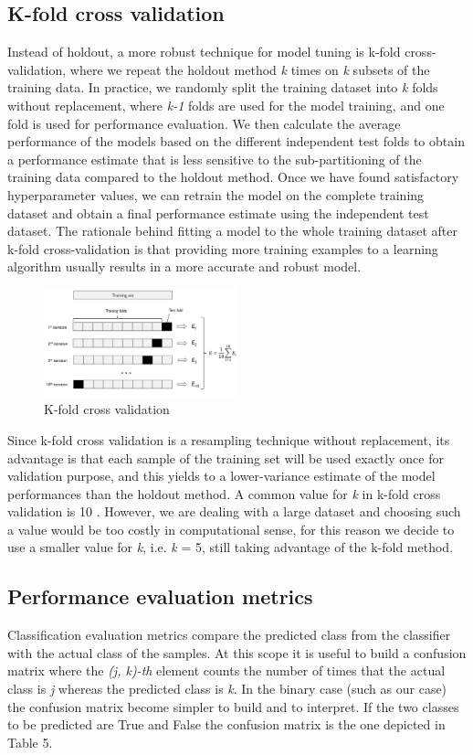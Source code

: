 \documentclass{article}
\begin{document}
\subsection{K-fold cross validation}
Instead of holdout, a more robust technique for model tuning is k-fold cross-validation, where we repeat the holdout method \emph{k} times on \emph{k} subsets of the training data. 
In practice, we randomly split the training dataset into \emph{k} folds without replacement, where \emph{k-1} folds are used for the model training, and one fold is used for performance evaluation. We then calculate the average performance of the models based on the different independent test folds to obtain a performance estimate that is less sensitive to the sub-partitioning of the training data compared to the holdout method. Once we have found satisfactory hyperparameter values, we can retrain the model on the complete training dataset and obtain a final performance estimate using the independent test dataset.
The rationale behind fitting a model to the whole training dataset after k-fold cross-validation is that providing more training examples to a learning algorithm usually results in a more accurate and robust model.

\begin{figure}[h]
\centering
\includegraphics[width=0.5\textwidth]{kfold.png}
\caption{K-fold cross validation }
\end{figure}
Since k-fold cross validation is a resampling technique without replacement, its advantage is that each sample of the training set will be used exactly once for validation purpose, and this yields to a lower-variance estimate of the model performances than the holdout method.
A common value for \emph{k} in k-fold cross validation is 10 \cite{undici}. However, we are dealing with a large dataset and choosing such a value would be too costly in computational sense, for this reason we decide to use a smaller value for \emph{k}, i.e. \emph{k} = 5, still taking advantage of the k-fold method.

\subsection{Performance evaluation metrics}
Classification evaluation metrics compare the predicted class from the classifier with the actual class of the samples. At this scope it is useful to build a confusion matrix where the \emph{(j, k)-th} element counts the number of times that the actual class is \emph{j} whereas the predicted class is \emph{k}.
In the binary case (such as our case) the confusion matrix become simpler to build and to
interpret. If the two classes to be predicted are True and False the confusion matrix is the one depicted in Table 5.
\end{document}
